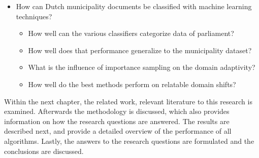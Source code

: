 \begin{itemize}
\item How can Dutch municipality documents be classified with machine learning techniques?  
\begin{itemize}
\item How well can the various classifiers categorize data of parliament?
\item How well does that performance generalize to the municipality dataset?
\item What is the influence of importance sampling on the domain adaptivity?
\item How well do the best methods perform on relatable domain shifts?
\end{itemize}
\end{itemize}
Within the next chapter, the related work, relevant literature to this research is examined. Afterwards the methodology is discussed, which also provides information on how the research questions are answered. The results are described next, and provide a detailed overview of the performance of all algorithms. Lastly, the answers to the research questions are formulated and the conclusions are discussed.


